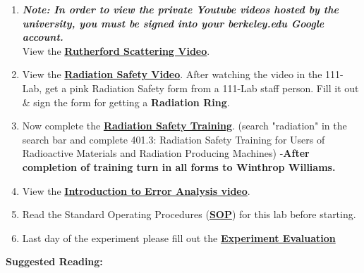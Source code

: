 \documentclass{../lab}
\begin{document}
\begin{enumerate}
    \item \emph{\textbf{Note: In order to view the private Youtube videos hosted by the university, you must be signed into your berkeley.edu Google account.}} \\
    View the \href{http://youtu.be/xHzzXiMEmaU}{\textbf{Rutherford Scattering Video}}.

    \item View the \href{http://youtu.be/KHxtzF5pZZM}{\textbf{\textbf{Radiation Safety Video}}}. After watching the video in the 111-Lab, get a pink Radiation Safety form from a 111-Lab staff person. Fill it out \& sign the form for getting a \textbf{Radiation Ring}.

    \item Now complete the  \href{https://berkeley-physics111b.github.io/safety/radiation/}{\textbf{Radiation Safety Training}}. (search "radiation" in the search bar and complete 401.3: Radiation Safety Training for Users of Radioactive Materials and Radiation Producing Machines) -\textbf{After completion of training turn in all forms to Winthrop Williams.}

    \item View the \href{\ErrorAnalysisVideo}{\textbf{Introduction to Error Analysis video}}.

    \item Read the Standard Operating Procedures (\href{https://berkeley-physics111b.github.io/assets/pdf/oldwebsitestructure/images/SOP\_3271\_Cs-137\_Na-22\_Co-60\_Mn-54\_Am-241\_Fe-55\_2014.pdf}{\textbf{SOP}}) for this lab before starting.

    \item Last day of the experiment please fill out the \href{\ExperimentEvaluation}{\textbf{Experiment Evaluation}}

\end{enumerate}

\noindent\textbf{Suggested Reading:}
\end{document}
